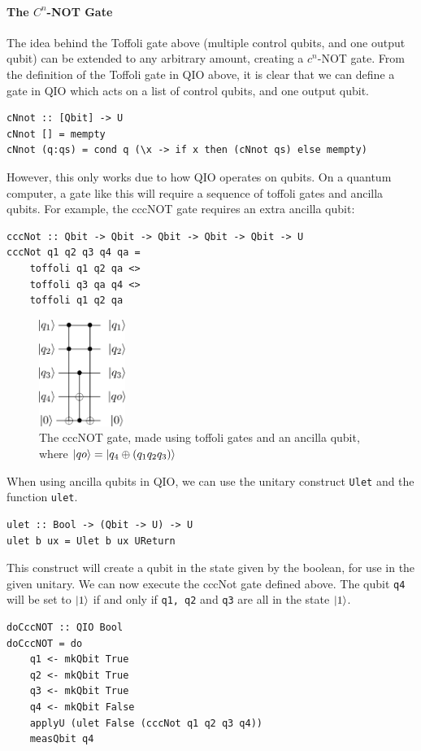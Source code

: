 \documentclass[a4paper,11pt, titlepage, twoside]{article}
\begin{document}
\paragraph{The $C^n$-NOT Gate}
The idea behind the Toffoli gate above (multiple control qubits, and one output qubit) can be extended to any arbitrary amount, creating a $c^n$-NOT gate. From the definition of the Toffoli gate in QIO above, it is clear that we can define a gate in QIO which acts on a list of control qubits, and one output qubit.
\begin{verbatim}
cNnot :: [Qbit] -> U
cNnot [] = mempty
cNnot (q:qs) = cond q (\x -> if x then (cNnot qs) else mempty)
\end{verbatim}
However, this only works due to how QIO operates on qubits. On a quantum computer, a gate like this will require a sequence of toffoli gates and ancilla qubits. For example, the cccNOT gate requires an extra ancilla qubit:
\begin{verbatim}
cccNot :: Qbit -> Qbit -> Qbit -> Qbit -> Qbit -> U
cccNot q1 q2 q3 q4 qa = 
    toffoli q1 q2 qa <>
    toffoli q3 qa q4 <>
    toffoli q1 q2 qa
\end{verbatim}
\begin{figure}[H]
	\centering
	\theverbbox\qquad
	\includegraphics[width=0.25\textwidth]{cccnot}
	\caption{The cccNOT gate, made using toffoli gates and an ancilla qubit, where $\ket{qo} = \ket{q_4 \oplus (q_1 q_2 q_3)}$}
\end{figure}
When using ancilla qubits in QIO, we can use the unitary construct \texttt{Ulet} and the function \texttt{ulet}.
\begin{verbatim}
ulet :: Bool -> (Qbit -> U) -> U
ulet b ux = Ulet b ux UReturn
\end{verbatim}
This construct will create a qubit in the state given by the boolean, for use in the given unitary. We can now execute the cccNot gate defined above. The qubit \texttt{q4} will be set to $\ket{1}$ if and only if \texttt{q1, q2} and \texttt{q3} are all in the state $\ket{1}$.
\begin{verbatim}
doCccNOT :: QIO Bool
doCccNOT = do
    q1 <- mkQbit True
    q2 <- mkQbit True
    q3 <- mkQbit True
    q4 <- mkQbit False
    applyU (ulet False (cccNot q1 q2 q3 q4))
    measQbit q4
\end{verbatim}
\end{document}
